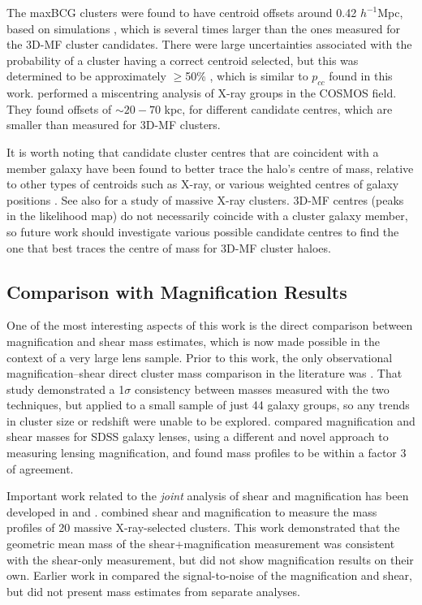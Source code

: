 The maxBCG clusters were found to have centroid offsets around 0.42 $h^{-1}$Mpc, based on simulations \citep{Johnston07}, which is several times larger than the ones measured for the \ac{3D-MF} cluster candidates. There were large uncertainties associated with the probability of a cluster having a correct centroid selected, but this was determined to be approximately $\ge$50\% \citep[see Figure 5 in][]{Johnston07}, which is similar to $p_{cc}$ found in this work. \citet{George12} performed a miscentring analysis of X-ray groups in the \ac{COSMOS} field. They found offsets of $\sim 20-70$ kpc, for different candidate centres, which are smaller than measured for \ac{3D-MF} clusters. 

It is worth noting that candidate cluster centres that are coincident with a member galaxy have been found to better trace the halo's centre of mass, relative to other types of centroids such as X-ray, or various weighted centres of galaxy positions \citep{George12}. See also \citet{Bildfell08} for a study of massive X-ray clusters. \ac{3D-MF} centres (peaks in the likelihood map) do not necessarily coincide with a cluster galaxy member, so future work should investigate various possible candidate centres to find the one that best traces the centre of mass for \ac{3D-MF} cluster haloes.


\subsection{Comparison with Magnification Results}
\label{sec:magn}

One of the most interesting aspects of this work is the direct comparison between magnification and shear mass estimates, which is now made possible in the context of a very large lens sample. Prior to this work, the only observational magnification--shear direct cluster mass comparison in the literature was \citet{Ford12}. That study demonstrated a 1$\sigma$ consistency between masses measured with the two techniques, but applied to a small sample of just 44 galaxy groups, so any trends in cluster size or redshift were unable to be explored. \citet{Huff14} compared magnification and shear masses for SDSS galaxy lenses, using a different and novel approach to measuring lensing magnification, and found mass profiles to be within a factor 3 of agreement.

Important work related to the {\it joint} analysis of shear and magnification has been developed in \citet{Umetsu11} and \citet{Umetsu13}. \citet{Umetsu14} combined shear and magnification to measure the mass profiles of 20 massive X-ray-selected clusters. This work demonstrated that the geometric mean mass of the shear+magnification measurement was consistent with the shear-only measurement, but did not show magnification results on their own. Earlier work in \citet{Umetsu11} compared the signal-to-noise of the magnification and shear, but did not present mass estimates from separate analyses. 


